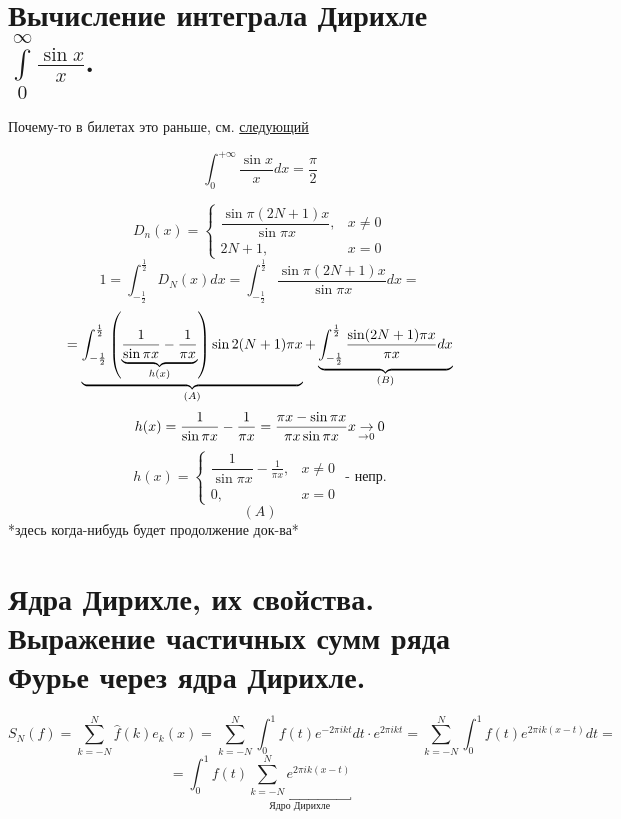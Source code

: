 \documentclass[matan]{subfiles}
\begin{document}
  \newpage
  \section{Вычисление интеграла Дирихле $\int\limits_0^\infty \frac{\sin x}{x}$.}

  Почему-то в билетах это раньше, см. \hyperlink{q52}{следующий}

  \begin{Example}
    \[\int_0^{+\infty} \frac{\sin x}{x} dx = \frac{\pi}{2}\]
  \end{Example}

  \begin{Proof}
    \[D_n(x) = \begin{cases}
        \dfrac{\sin \pi(2N + 1)x}{\sin \pi x}, & x \neq 0\\
        2N + 1, & x = 0
    \end{cases}\]\]
    \[1 = \int_{-\frac{1}{2}}^{\frac{1}{2}} D_N(x) dx =
    \int_{-\frac{1}{2}}^{\frac{1}{2}} \dfrac{\sin \pi(2N + 1)x}{\sin \pi x} dx =\]
    \[ = \ub{(A)}{ \int_{-\frac{1}{2}}^{\frac{1}{2}} \Br{\ub{h(x)}{\frac{1}{\sin \pi x} - \frac{1}{\pi x}}} \sin 2(N+1)\pi x} + \ub{(B)}{\int_{-\frac{1}{2}}^{\frac{1}{2}} \frac{\sin(2N + 1) \pi x}{\pi x} dx}\]
    \[h(x) = \frac{1}{\sin \pi x} - \frac{1}{\pi x} = \frac{\pi x - \sin \pi x}{\pi x \sin \pi x} \us{\ra 0}{x \ra 0}\]
    \[h(x) = \begin{cases}
      \dfrac{1}{\sin \pi x} - \frac{1}{\pi x}, & x \neq 0\\
      0, & x = 0
    \end{cases} \text{ - непр.}\]
    \[(A)\]
    *здесь когда-нибудь будет продолжение док-ва*
  \end{Proof}


  \newpage
  \section{Ядра Дирихле, их свойства. Выражение частичных сумм ряда Фурье через ядра Дирихле.}
  \hypertarget{q52}{}

      \[S_N(f) = \sum_{k = -N}^N \hat{f}(k)e_k(x) = \sum_{k = -N}^N \int_0^1
      f(t)e^{-2 \pi ikt} dt \cdot e^{2\pi ikt} = \sum_{k = -N}^N \int_0^1 f(t)
      e^{2\pi ik(x - t)}dt  = \]
      \[= \int_0^1 f(t) \underbracket{\sum_{k = -N}^N e^{2\pi ik(x - t)}}_
      {\text{Ядро Дирихле}}   \]
\end{document}
